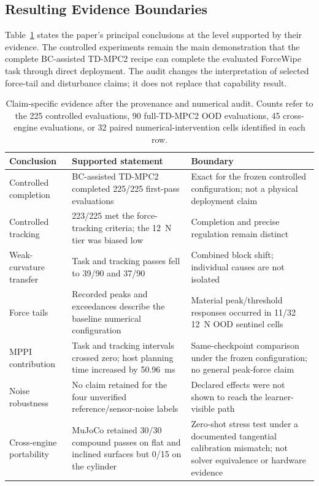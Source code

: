 \subsection{Resulting Evidence Boundaries}

Table~\ref{tab:evidence_boundaries} states the paper's principal conclusions
at the level supported by their evidence. The controlled experiments remain
the main demonstration that the complete BC-assisted TD-MPC2 recipe can
complete the evaluated ForceWipe task through direct deployment. The audit
changes the interpretation of selected force-tail and disturbance claims; it
does not replace that capability result.

\begin{table}[t]
\centering
\caption{Claim-specific evidence after the provenance and numerical audit.
Counts refer to the 225 controlled evaluations, 90 full-TD-MPC2 OOD
evaluations, 45 cross-engine evaluations, or 32 paired numerical-intervention
cells identified in each row.}
\label{tab:evidence_boundaries}
\small
\setlength{\tabcolsep}{4pt}
\begin{tabular}{@{}p{}p{}p{}@{}}
\toprule
Conclusion & Supported statement & Boundary \\
\midrule
Controlled completion & BC-assisted TD-MPC2 completed 225/225 first-pass evaluations & Exact for the frozen controlled configuration; not a physical deployment claim \\
Controlled tracking & 223/225 met the force-tracking criteria; the 12~N tier was biased low & Completion and precise regulation remain distinct \\
Weak-curvature transfer & Task and tracking passes fell to 39/90 and 37/90 & Combined block shift; individual causes are not isolated \\
Force tails & Recorded peaks and exceedances describe the baseline numerical configuration & Material peak/threshold responses occurred in 11/32 12~N OOD sentinel cells \\
MPPI contribution & Task and tracking intervals crossed zero; host planning time increased by 50.96~ms & Same-checkpoint comparison under the frozen configuration; no general peak-force claim \\
Noise robustness & No claim retained for the four unverified reference/sensor-noise labels & Declared effects were not shown to reach the learner-visible path \\
Cross-engine portability & MuJoCo retained 30/30 compound passes on flat and inclined surfaces but 0/15 on the cylinder & Zero-shot stress test under a documented tangential calibration mismatch; not solver equivalence or hardware evidence \\
\bottomrule
\end{tabular}
\end{table}
